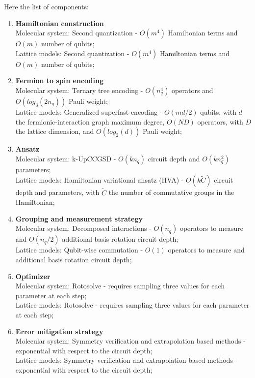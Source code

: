 Here the list of components:
\begin{enumerate}
    \item \textbf{Hamiltonian construction} \\
    Molecular system: Second quantization - $O(m^4)$ Hamiltonian terms and $O(m)$ number of qubits; \\
    Lattice models: Second quantization - $O(m^4)$ Hamiltonian terms and $O(m)$ number of qubits;
    
    \item \textbf{Fermion to spin encoding} \\
    Molecular system: Ternary tree encoding - $O(n_q^4)$ operators and $O(log_3(2n_q))$ Pauli weight; \\
    Lattice models: Generalized superfast encoding - $O(md/2)$ qubits, with $d$ the fermionic-interaction graph maximum degree, $O(ND)$ operators, with $D$ the lattice dimension, and $O(log_2(d))$ Pauli weight;
    
    \item \textbf{Ansatz} \\
    Molecular system: k-UpCCGSD - $O(kn_q)$ circuit depth and $O(kn_q^2)$ parameters; \\
    Lattice models: Hamiltonian variational ansatz (HVA) - $O(k\tilde{C})$ circuit depth and parameters, with $\tilde{C}$ the number of commutative groups in the Hamiltonian;
    
    \item \textbf{Grouping and measurement strategy} \\
    Molecular system: Decomposed interactions - $O(n_q)$ operators to measure and $O(n_q/2)$ additional basis rotation circuit depth; \\
    Lattice models: Qubit-wise commutation - $O(1)$ operators to measure and additional basis rotation circuit depth;
    
    \item \textbf{Optimizer} \\
    Molecular system: Rotosolve - requires sampling three values for each parameter at each step; \\
    Lattice models: Rotosolve - requires sampling three values for each parameter at each step;
    
    \item \textbf{Error mitigation strategy} \\
    Molecular system: Symmetry verification and extrapolation based methods - exponential with respect to the circuit depth; \\
    Lattice models: Symmetry verification and extrapolation based methods - exponential with respect to the circuit depth;
\end{enumerate}
